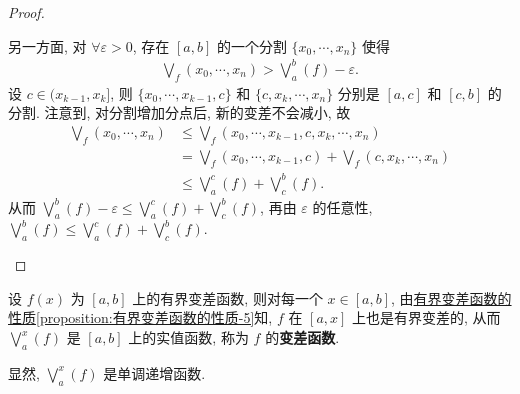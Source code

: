 \documentclass[../../main.tex]{subfiles}%
\begin{document}
\begin{proof}
\begin{enumerate}[(1)]
另一方面, 对 $\forall\varepsilon>0$, 存在 $[a,b]$ 的一个分割 $\{x_0,\cdots,x_n\}$ 使得
\begin{align*}
\bigvee_f(x_0,\cdots,x_n)>\bigvee_a^b(f)-\varepsilon.
\end{align*}
设 $c\in(x_{k-1},x_k]$, 则 $\{x_0,\cdots,x_{k-1},c\}$ 和 $\{c,x_k,\cdots,x_n\}$ 分别是 $[a,c]$ 和 $[c,b]$ 的分割. 注意到, 对分割增加分点后, 新的变差不会减小, 故
\begin{align*}
\bigvee_f(x_0,\cdots,x_n) &\leqslant \bigvee_f(x_0,\cdots,x_{k-1},c,x_k,\cdots,x_n) \\
&= \bigvee_f(x_0,\cdots,x_{k-1},c)+\bigvee_f(c,x_k,\cdots,x_n) \\
&\leqslant \bigvee_a^c(f)+\bigvee_c^b(f).
\end{align*}
从而 $\bigvee_a^b(f)-\varepsilon\leqslant\bigvee_a^c(f)+\bigvee_c^b(f)$, 再由 $\varepsilon$ 的任意性, $\bigvee_a^b(f)\leqslant\bigvee_a^c(f)+\bigvee_c^b(f)$.
\end{enumerate}
\end{proof}

\begin{definition}[变差函数]
设 $f(x)$ 为 $[a,b]$ 上的有界变差函数, 则对每一个 $x\in[a,b]$, 由\hyperref[proposition:有界变差函数的性质]{有界变差函数的性质\ref{proposition:有界变差函数的性质-5}}知, $f$ 在 $[a,x]$ 上也是有界变差的, 从而 $\bigvee_a^x(f)$ 是 $[a,b]$ 上的实值函数, 称为 $f$ 的\textbf{变差函数}.
\end{definition}
\begin{remark}
显然, $\bigvee_a^x(f)$ 是单调递增函数.
\end{remark}
\end{document}

